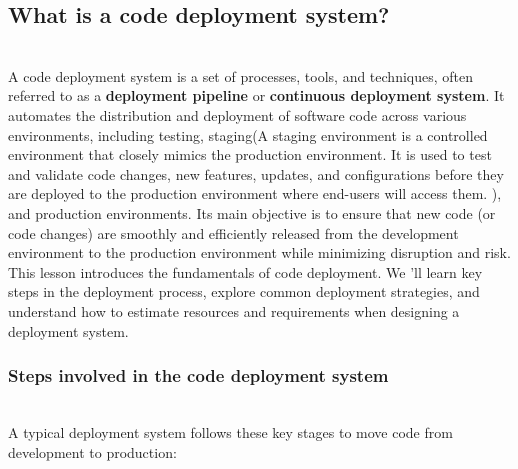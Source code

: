 

\subsection{What is a code deployment system?}\label{ikoZrLyWkbOl6Z9nbYt8f}
\\
A code deployment system is a set of processes, tools, and techniques, often referred to as a \textbf{deployment pipeline} or \textbf{continuous deployment system}. It automates the distribution and deployment of software code across various environments, including testing, staging(A staging environment is a controlled environment that closely mimics the production environment. It is used to test and validate code changes, new features, updates, and configurations before they are deployed to the production environment where end-users will access them. ), and production environments. Its main objective is to ensure that new code (or code changes) are smoothly and efficiently released from the development environment to the production environment while minimizing disruption and risk.
\\
This lesson introduces the fundamentals of code deployment. We 'll learn key steps in the deployment process, explore common deployment strategies, and understand how to estimate resources and requirements when designing a deployment system.

\subsubsection{Steps involved in the code deployment system}\label{foex7ljv6FDUsYM2eEp4G}
\\
A typical deployment system follows these key stages to move code from development to production:

